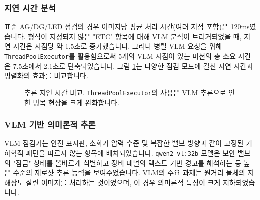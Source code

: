 \subsubsection{지연 시간 분석}
표준 AG/DG/LED 점검의 경우 이미지당 평균 처리 시간(여러 지점 포함)은 120ms였습니다.
형식이 지정되지 않은 "ETC" 항목에 대해 VLM 분석이 트리거되었을 때, 지연 시간은 지점당 약 1.5초로 증가했습니다.
그러나 병렬 VLM 요청을 위해 \texttt{ThreadPoolExecutor}를 활용함으로써 5개의 VLM 지점이 있는 미션의 총 소요 시간은 7.5초에서 2.1초로 단축되었습니다.
그림 \ref{fig:latency_analysis}는 다양한 점검 모드에 걸친 지연 시간과 병렬화의 효과를 비교합니다.

\begin{figure}[h]
\centering
\fbox{\rule{0pt}{1.5in} \rule{0.8\linewidth}{0pt}} %
\caption{추론 지연 시간 비교. \texttt{ThreadPoolExecutor}의 사용은 VLM 추론으로 인한 병목 현상을 크게 완화합니다.}
\label{fig:latency_analysis}
\end{figure}

\subsubsection{VLM 기반 의미론적 추론}
VLM 점검기는 안전 표지판, 소화기 압력 수준 및 복잡한 밸브 방향과 같이 고정된 기하학적 패턴을 따르지 않는 항목에 배치되었습니다.
\texttt{qwen2-vl:32b} 모델은 보안 밸브의 "잠금" 상태를 올바르게 식별하고 장비 패널의 텍스트 기반 경고를 해석하는 등 높은 수준의 제로샷 추론 능력을 보여주었습니다.
VLM의 주요 과제는 원거리 물체의 저해상도 잘린 이미지를 처리하는 것이었으며, 이 경우 의미론적 특징이 크게 저하되었습니다.

